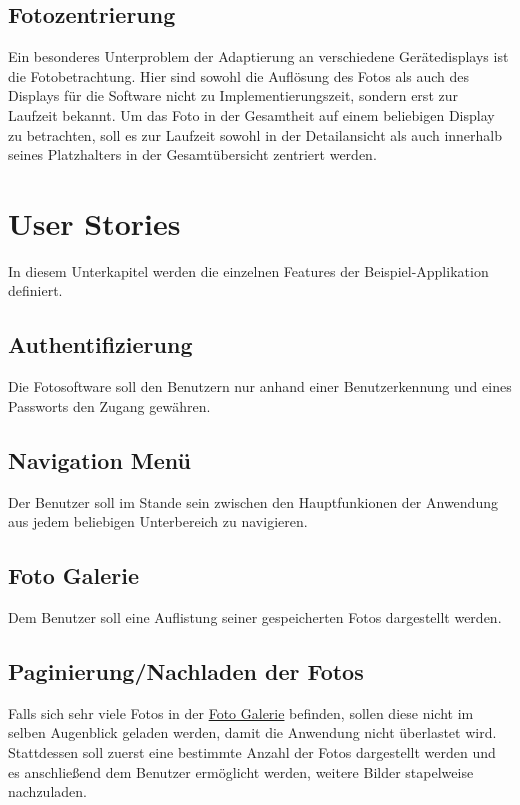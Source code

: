 \subsection{Fotozentrierung}
\label{sec:spec:photo_centering}

Ein besonderes Unterproblem der Adaptierung an verschiedene Gerätedisplays ist die Fotobetrachtung. Hier sind sowohl die Auflösung des Fotos als auch des Displays für die Software nicht zu Implementierungszeit, sondern erst zur Laufzeit bekannt. Um das Foto in der Gesamtheit auf einem beliebigen Display zu betrachten, soll es zur Laufzeit sowohl in der Detailansicht als auch innerhalb seines Platzhalters in der Gesamtübersicht zentriert werden.

\section{User Stories}

In diesem Unterkapitel werden die einzelnen Features der Beispiel-Applikation definiert.

\subsection{Authentifizierung}
\label{sec:spec:authentication}

Die Fotosoftware soll den Benutzern nur anhand einer Benutzerkennung und eines Passworts den Zugang gewähren.

\subsection{Navigation Menü}
\label{sec:spec:menu}

Der Benutzer soll im Stande sein zwischen den Hauptfunkionen der Anwendung aus jedem beliebigen Unterbereich zu navigieren.

\subsection{Foto Galerie}
\label{sec:spec:photo_gallery}

Dem Benutzer soll eine Auflistung seiner gespeicherten Fotos dargestellt werden.

\subsection{Paginierung/Nachladen der Fotos}
\label{sec:spec:pagination}

Falls sich sehr viele Fotos in der \hyperref[sec:spec:photo_gallery]{Foto Galerie} befinden, sollen diese nicht im selben Augenblick geladen werden, damit die Anwendung nicht überlastet wird. Stattdessen soll zuerst eine bestimmte Anzahl der Fotos dargestellt werden und es anschließend dem Benutzer ermöglicht werden, weitere Bilder stapelweise nachzuladen.

